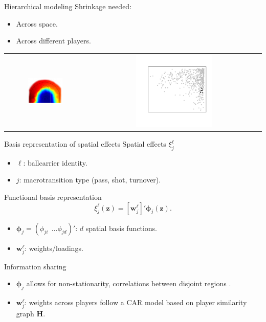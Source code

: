 \documentclass[10pt]{beamer}
\newcommand{\bz}{\mathbf{z}}
\begin{document}
\begin{frame}{Hierarchical modeling}
Shrinkage needed:
\begin{itemize}
\item Across space.
\item Across different players.
\end{itemize}
\begin{tabular}{cc}
\includegraphics[width=0.45\textwidth]{graphics/shotspace2}
&
\includegraphics[width=0.45\textwidth]{graphics/howard_graph}
\end{tabular}
\end{frame}

\begin{frame}{Basis representation of spatial effects}
Spatial effects $\xi^{\ell}_j$
\begin{itemize}
\item $\ell$: ballcarrier identity.
\item $j$: macrotransition type (pass, shot, turnover).
\end{itemize}
\pause
Functional basis representation
\begin{equation*}
\xi^{\ell}_j (\bz) = [\mathbf{w}^{\ell}_j]'\boldsymbol{\phi}_j(\bz).
\end{equation*}
\begin{itemize}
\item $\boldsymbol{\phi}_j = (\phi_{ji} \: \: \ldots \phi_{jd})'$: $d$ spatial basis functions.
\item $\mathbf{w}_j^{\ell}$: weights/loadings.
\end{itemize}
\pause
Information sharing
\begin{itemize}
\item $\boldsymbol{\phi}_j$ allows for non-stationarity, correlations between disjoint regions \cite{higdon2002space}.
\item $\mathbf{w}_j^{\ell}$: weights across players follow a CAR model \cite{besag1974spatial} based on player similarity graph $\mathbf{H}$.
\end{itemize}
\end{frame}
\end{document}
